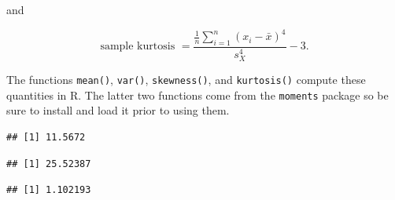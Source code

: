 \documentclass[
]{book}
\newenvironment{Shaded}{\begin{snugshade}}{\end{snugshade}}
\newcommand{\DocumentationTok}[1]{\textcolor[rgb]{0.56,0.35,0.01}{\textbf{\textit{#1}}}}
\newcommand{\FunctionTok}[1]{\textcolor[rgb]{0.13,0.29,0.53}{\textbf{#1}}}
\newcommand{\NormalTok}[1]{#1}
\newcommand{\SpecialCharTok}[1]{\textcolor[rgb]{0.81,0.36,0.00}{\textbf{#1}}}
\begin{document}
and

\begin{equation} 
\text{sample kurtosis } =  \frac{\frac{1}{n} \sum_{i=1}^n (x_i - \bar{x})^4}{s_X^4} - 3.
\label{eq:4-sampkurt}
\end{equation}

The functions \texttt{mean()}, \texttt{var()}, \texttt{skewness()}, and \texttt{kurtosis()} compute these quantities in R. The latter two functions come from the \texttt{moments} package so be sure to install and load it prior to using them.

\begin{Shaded}
\end{Shaded}

\begin{verbatim}
## [1] 11.5672
\end{verbatim}

\begin{Shaded}
\end{Shaded}

\begin{verbatim}
## [1] 25.52387
\end{verbatim}

\begin{Shaded}
\end{Shaded}

\begin{verbatim}
## [1] 1.102193
\end{verbatim}

\begin{Shaded}
\end{Shaded}
\end{document}
